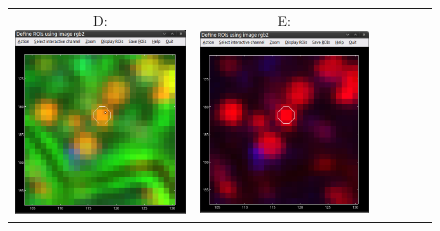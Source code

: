 \begin{figure}[!ht]
\begin{tabular}{cccccc}
\\[5mm]
D: \includegraphics[scale=0.23]{figs3/LANS-roi-interactive3}
&
E: \includegraphics[scale=0.23]{figs3/LANS-roi-interactive4}

\end{tabular}
\end{figure}
